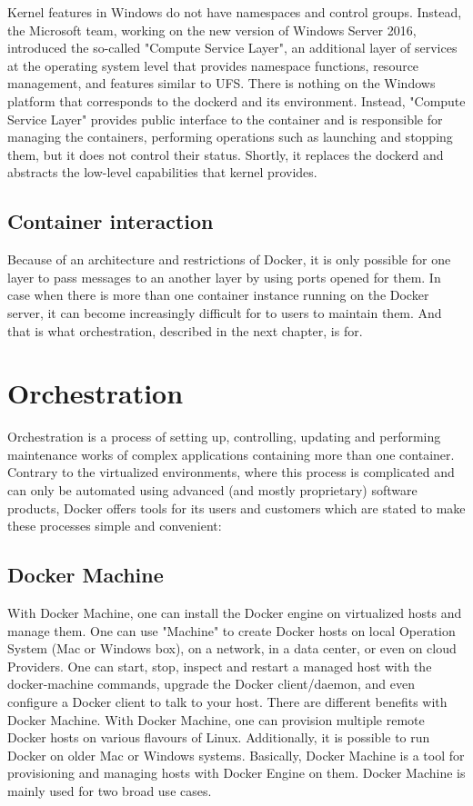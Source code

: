 Kernel features in Windows do not have namespaces and control groups.
Instead, the Microsoft team, working on the new version of Windows Server 2016,
introduced the so-called "Compute Service Layer",
an additional layer of services at the operating
system level that provides namespace functions, resource management,
and features similar to UFS.
There is nothing on the Windows platform that corresponds
to the dockerd and its environment.
Instead, "Compute Service Layer" provides public interface to the container
and is responsible for managing the containers, performing operations
such as launching and stopping them, but it does not control their status.
Shortly, it replaces the dockerd and
abstracts the low-level capabilities that kernel provides.

\subsection{Container interaction}

Because of an architecture and restrictions of Docker, it is only possible for
one layer to pass messages to an another layer by using ports opened for them.
In case when there is more than one container
instance running on the Docker server, it can become increasingly difficult for
to users to maintain them. And that is what orchestration, described in the next
chapter, is for.

\section{Orchestration}

Orchestration is a process of setting up, controlling, updating
and performing maintenance works of complex applications containing more than
one container. Contrary to the virtualized environments, where this
process is complicated and can only be automated using advanced (and mostly
proprietary) software products, Docker offers tools for its users and customers
which are stated to make these processes simple and convenient:

\subsection{Docker Machine}

With Docker Machine, one can install the Docker engine on virtualized
hosts and manage them. One can use "Machine" to create Docker
hosts on local Operation System (Mac or Windows box), on a
network, in a data center, or even on cloud Providers.
One can start, stop, inspect and restart a managed host
with the docker-machine commands, upgrade the Docker client/daemon, and
even configure a Docker client to talk to your host. There are different
benefits with Docker Machine. With Docker Machine, one can provision
multiple remote Docker hosts on various flavours of Linux.
Additionally, it is possible to run Docker on older Mac or Windows systems.
Basically, Docker Machine is a tool for provisioning and
managing hosts with Docker Engine on them.
Docker Machine is mainly used for two broad use cases.

